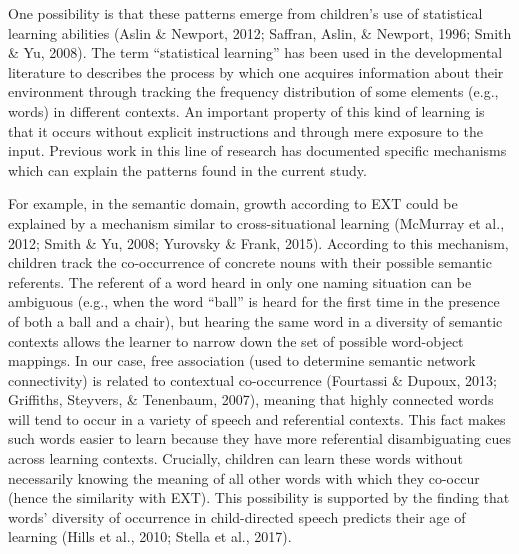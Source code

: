 \documentclass[english,floatsintext,man]{apa6}
\theoremstyle{definition}
\theoremstyle{definition}
\theoremstyle{definition}
\theoremstyle{remark}
\begin{document}
One possibility is that these patterns emerge from children's use of
statistical learning abilities (Aslin \& Newport, 2012; Saffran, Aslin,
\& Newport, 1996; Smith \& Yu, 2008). The term \enquote{statistical
learning} has been used in the developmental literature to describes the
process by which one acquires information about their environment
through tracking the frequency distribution of some elements (e.g.,
words) in different contexts. An important property of this kind of
learning is that it occurs without explicit instructions and through
mere exposure to the input. Previous work in this line of research has
documented specific mechanisms which can explain the patterns found in
the current study.

For example, in the semantic domain, growth according to EXT could be
explained by a mechanism similar to cross-situational learning (McMurray
et al., 2012; Smith \& Yu, 2008; Yurovsky \& Frank, 2015). According to
this mechanism, children track the co-occurrence of concrete nouns with
their possible semantic referents. The referent of a word heard in only
one naming situation can be ambiguous (e.g., when the word
\enquote{ball} is heard for the first time in the presence of both a
ball and a chair), but hearing the same word in a diversity of semantic
contexts allows the learner to narrow down the set of possible
word-object mappings. In our case, free association (used to determine
semantic network connectivity) is related to contextual co-occurrence
(Fourtassi \& Dupoux, 2013; Griffiths, Steyvers, \& Tenenbaum, 2007),
meaning that highly connected words will tend to occur in a variety of
speech and referential contexts. This fact makes such words easier to
learn because they have more referential disambiguating cues across
learning contexts. Crucially, children can learn these words without
necessarily knowing the meaning of all other words with which they
co-occur (hence the similarity with EXT). This possibility is supported
by the finding that words' diversity of occurrence in child-directed
speech predicts their age of learning (Hills et al., 2010; Stella et
al., 2017).
\end{document}
